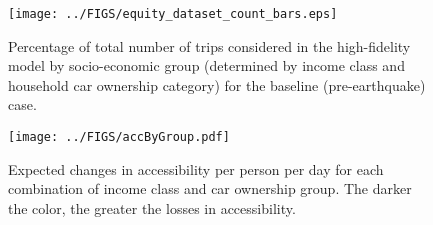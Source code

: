 \begin{figure}[h]
\centering
\texttt{[image: ../FIGS/equity\_dataset\_count\_bars.eps]} 
\caption{Percentage of total number of trips considered in the high-fidelity model by socio-economic group (determined by income class and household car ownership category) for the baseline (pre-earthquake) case.}
\label{fig:car}
\end{figure}


 
\begin{figure*}[h!]
    \centering
    \texttt{[image: ../FIGS/accByGroup.pdf]}
\caption{Expected changes in accessibility per person per day for each combination of income class and car ownership group. The darker the color, the greater the losses in accessibility.}%
\label{fig:acc_by_segment}
\end{figure*}



